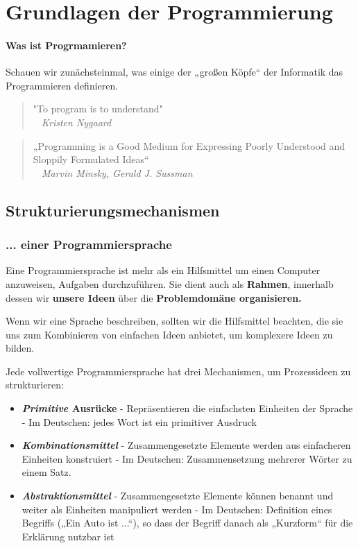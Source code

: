 
\chapter{Grundlagen der Programmierung}
\label{c:grundlagen}
\setcounter{page}{1}
\subsubsection{Was ist Progrmamieren?}

Schauen wir zunächsteinmal, was einige der „großen Köpfe“ der
Informatik das Programmieren definieren.

\begin{quote}
	"To program is to understand" \\
	\textit{~ Kristen Nygaard}
\end{quote}

\begin{quote}
	„Programming is a Good Medium for Expressing Poorly
	Understood and Sloppily Formulated Ideas“\\
	\textit{~ Marvin Minsky, Gerald J. Sussman}
\end{quote}

\section{Strukturierungsmechanismen}

\subsection{... einer Programmiersprache}

Eine Programmiersprache ist mehr als ein Hilfsmittel um einen
Computer anzuweisen, Aufgaben durchzuführen.
Sie dient auch als \textbf{Rahmen}, innerhalb dessen wir \textbf{unsere
Ideen} über die \textbf{Problemdomäne organisieren.}

Wenn wir eine Sprache beschreiben, sollten wir
die Hilfsmittel beachten, die sie uns zum
Kombinieren von einfachen Ideen anbietet, um
komplexere Ideen zu bilden.

Jede vollwertige Programmiersprache hat drei Mechanismen,
um Prozessideen zu strukturieren:

\begin{itemize}
	\item \textbf{\textit{Primitive} Ausrücke}
		\subitem - Repräsentieren die einfachsten Einheiten der Sprache
		\subitem - Im Deutschen: jedes Wort ist ein primitiver Ausdruck
	\item \textbf{\textit{Kombinationsmittel}}
		\subitem - Zusammengesetzte Elemente werden aus einfacheren Einheiten
		konstruiert
		\subitem - Im Deutschen: Zusammensetzung mehrerer Wörter zu einem Satz.
	\item \textbf{\textit{Abstraktionsmittel}}
		\subitem - Zusammengesetzte Elemente können benannt und weiter als Einheiten manipuliert werden
		\subitem - Im Deutschen: Definition eines Begriffs („Ein Auto ist ...“), so dass der Begriff danach als „Kurzform“ für die Erklärung nutzbar ist
\end{itemize}

